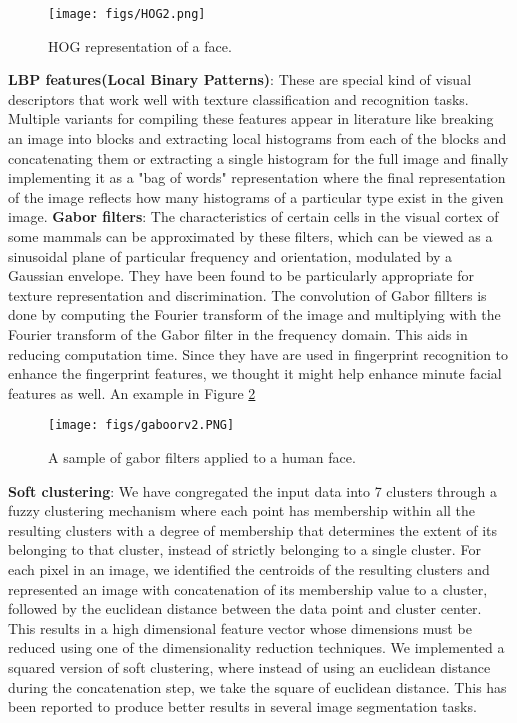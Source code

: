 \documentclass[10pt,twocolumn,letterpaper]{article}
\begin{document}
\begin{figure}[h]
\texttt{[image: figs/HOG2.png]}
\caption{HOG representation of a face.}
\label{fig:hog_image}
\end{figure}

\textbf{LBP features(Local Binary Patterns)}: These are special kind of visual descriptors that work well with texture classification and recognition tasks. Multiple variants for compiling these features appear in literature like breaking an image into blocks and extracting local histograms from each of the blocks and concatenating them or extracting a single histogram for the full image and finally implementing it as a "bag of words" representation where the final representation of the image reflects how many histograms of a particular type exist in the given  image. \newline
\textbf{Gabor filters}: The characteristics of certain cells in the visual cortex of some mammals can be approximated by these filters, which can be viewed as a sinusoidal plane of particular frequency and orientation, modulated by a Gaussian envelope. They have been found to be particularly appropriate for texture representation and discrimination. The convolution of Gabor fillters is done by computing the Fourier transform of the image and multiplying with the Fourier transform of the Gabor filter in the frequency domain. This aids in reducing computation time. Since they have are used in fingerprint recognition to enhance the fingerprint features, we thought it might help enhance minute facial features as well. An example in Figure \ref{fig:gabor_image} \newline

\begin{figure}[h]
\texttt{[image: figs/gaboorv2.PNG]}
\caption{A sample of gabor filters applied to a human face.}
\label{fig:gabor_image}
\end{figure}

\textbf{Soft clustering}: We have congregated the input data into 7 clusters through a fuzzy clustering mechanism where each point has membership within all the resulting clusters with a degree of membership that determines the extent of its belonging to that cluster, instead of strictly belonging to a single cluster. For each pixel in an image, we identified the centroids of the resulting clusters and represented an image with concatenation of its membership value to a cluster, followed by the euclidean distance between the data point and cluster center. This results in a high dimensional feature vector whose dimensions must be reduced using one of the dimensionality reduction techniques. We implemented a squared version of soft clustering, where instead of using an euclidean distance during the concatenation step, we take the square of euclidean distance. This has been reported to produce better results in several image segmentation tasks.\newline
\end{document}
